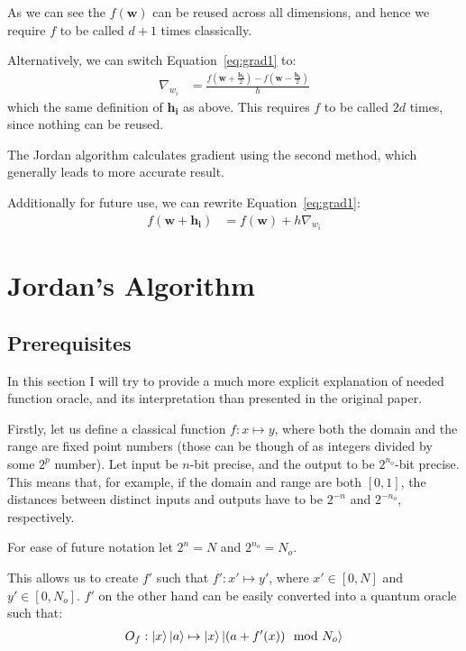 \documentclass{article}
\begin{document}
As we can see the $f(\pmb{w})$ can be reused across all dimensions, and hence we require $f$ to be called $d + 1$ times classically.

Alternatively, we can switch Equation~\ref{eq:grad1} to:
\begin{align}
    \label{eq:grad2}
    \nabla_{w_i} &= \frac{f(\pmb{w} + \frac{\pmb{h_i}}{2}) - f(\pmb{w} - \frac{\pmb{h_i}}{2})}{h}
\end{align}
which the same definition of $\pmb{h_i}$ as above. This requires $f$ to be called $2d$ times, since nothing can be reused.

The Jordan algorithm calculates gradient using the second method, which generally leads to more accurate result.

Additionally for future use, we can rewrite Equation~\ref{eq:grad1}:
\begin{align}
    \label{eq:grad-lemma}
    f(\pmb{w} + \pmb{h_i}) &= f(\pmb{w}) + h\nabla_{w_i}
\end{align}

\section{Jordan's Algorithm}
\label{sec:jord-alg}
\subsection{Prerequisites}
\label{sec:jord-preq}
In this section I will try to provide a much more explicit explanation of needed function oracle,
and its interpretation than presented in the original paper.

Firstly, let us define a classical function $f: x \mapsto y$, where both the domain and the range are fixed point numbers (those can be though of as integers divided by some $2^p$ number).
Let input be $n$-bit precise, and the output to be $2^{n_o}$-bit precise. This means that, for example, if the domain and range are both $[0, 1]$, the distances between distinct inputs and outputs have to be $2^{-n}$ and $2^{-n_o}$, respectively.

For ease of future notation let $2^n = N$ and $2^{n_o} = N_o$.

This allows us to create $f'$ such that $f': x' \mapsto y'$, where $x' \in [0, N]$ and $y' \in [0, N_o]$.
$f'$ on the other hand can be easily converted into a quantum oracle such that:
\begin{align}
    O_f: \ket{x}\ket{a} \mapsto \ket{x}\ket{(a + f'(x)) \mod N_o}
\end{align}
\end{document}
